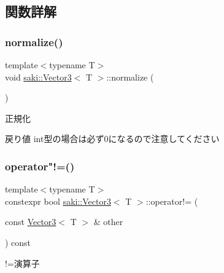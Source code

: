 \subsection{関数詳解}
\mbox{\label{classsaki_1_1_vector3_a7b9496274bab6ea6147e6a09e1493110}} 
\subsubsection{\texorpdfstring{normalize()}{normalize()}}
{\footnotesize\ttfamily template$<$typename T$>$ \\
void \mbox{\hyperlink{classsaki_1_1_vector3}{saki\+::\+Vector3}}$<$ T $>$\+::normalize (\begin{DoxyParamCaption}{ }\end{DoxyParamCaption})\hspace{0.3cm}{\ttfamily [inline]}}



正規化 

\begin{DoxyReturn}{戻り値}
int型の場合は必ず0になるので注意してください 
\end{DoxyReturn}
\mbox{\label{classsaki_1_1_vector3_aaaf161e4fc7f76aeee0d074efd411748}} 
\subsubsection{\texorpdfstring{operator"!=()}{operator!=()}}
{\footnotesize\ttfamily template$<$typename T$>$ \\
constexpr bool \mbox{\hyperlink{classsaki_1_1_vector3}{saki\+::\+Vector3}}$<$ T $>$\+::operator!= (\begin{DoxyParamCaption}\item[{const \mbox{\hyperlink{classsaki_1_1_vector3}{Vector3}}$<$ T $>$ \&}]{other }\end{DoxyParamCaption}) const\hspace{0.3cm}{\ttfamily [inline]}}



!=演算子 

\mbox{\label{classsaki_1_1_vector3_a5136a5b7f840d84ecce85a760d17bf6f}} 
